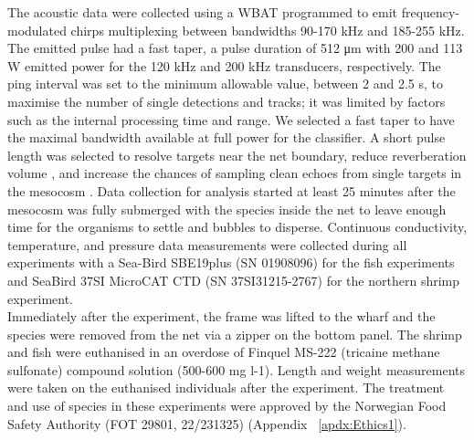 {The acoustic data were collected using a WBAT programmed to emit frequency-modulated chirps multiplexing between bandwidths 90-170 kHz and 185-255 kHz. The emitted pulse had a fast taper, a pulse duration of 512 μm with 200 and 113 W emitted power for the 120 kHz and 200 kHz transducers, respectively. The ping interval was set to the minimum allowable value, between 2 and 2.5 s, to maximise the number of single detections and tracks; it was limited by factors such as the internal processing time and range. We selected a fast taper to have the maximal bandwidth available at full power for the classifier. A short pulse length was selected to resolve targets near the net boundary, reduce reverberation volume \citep{Soule1997}, and increase the chances of sampling clean echoes from single targets in the mesocosm \citep{Gugele2021}. Data collection for analysis started at least 25 minutes after the mesocosm was fully submerged with the species inside the net to leave enough time for the organisms to settle and bubbles to disperse. 
Continuous conductivity, temperature, and pressure data measurements were collected during all experiments with a Sea-Bird SBE19plus (SN 01908096) for the fish experiments and SeaBird 37SI MicroCAT CTD (SN 37SI31215-2767) for the northern shrimp experiment.\\
Immediately after the experiment, the frame was lifted to the wharf and the species were removed from the net via a zipper on the bottom panel. The shrimp and fish were euthanised in an overdose of Finquel MS-222 (tricaine methane sulfonate) compound solution (500-600 mg l-1). Length and weight measurements were taken on the euthanised individuals after the experiment. The treatment and use of species in these experiments were approved by the Norwegian Food Safety Authority (FOT 29801, 22/231325) (Appendix ~\ref{apdx:Ethics1}).





}

